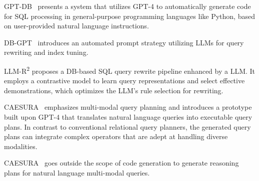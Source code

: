 {GPT-DB~\cite{DBLP:journals/pvldb/Trummer23} presents a system that utilizes GPT-4 to automatically generate code for SQL processing in general-purpose programming languages like Python, based on user-provided natural language instructions. 

DB-GPT~\cite{DBLP:journals/dase/ZhouSL24} introduces an automated prompt strategy utilizing LLMs for query rewriting and index tuning. 

LLM-R\textsuperscript{2}\cite{DBLP:journals/corr/abs-2404-12872} proposes a DB-based SQL query rewrite pipeline enhanced by a LLM. It employs a contrastive model to learn query representations and select effective demonstrations, which optimizes the LLM's rule selection for rewriting.

CAESURA~\cite{DBLP:conf/cidr/UrbanB24} emphasizes multi-modal query planning and introduces a prototype built upon GPT-4 that translates natural language queries into executable query plans. In contrast to conventional relational query planners, the generated query plans can integrate complex operators that are adept at handling diverse modalities.

CAESURA~\cite{DBLP:conf/cidr/UrbanB24} goes outside the scope of code generation to generate reasoning plans
for natural language multi-modal queries.
}








